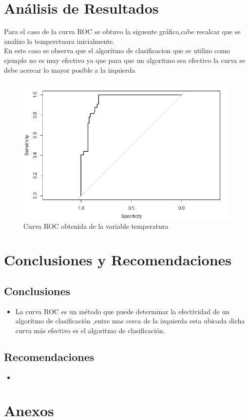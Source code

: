 \documentclass[10pt,a4paper]{article}
\begin{document}
\section{Análisis de Resultados}
Para el caso de la curva ROC se obtuvo la siguente gráfica,cabe recalcar que se analizo la temperetuara inicialmente.\\
En este caso se observa que el algoritmo de clasificacion que se utilizo como ejemplo no es muy efectivo ya que para que un algoritmo sea efectivo la curva se debe acercar lo mayor posible a la izquierda 
\begin{figure}[H]
\centering
\includegraphics[scale=0.48]{curva.png}
\caption{Curva ROC obtenida de la variable temperatura}
\label{esquematic}
\end{figure}
\section{Conclusiones y Recomendaciones}

\subsection*{Conclusiones}
\begin{itemize}
\item La curva ROC es un método que puede determinar la efectividad de un algoritmo de clasificación ,entre mas cerca de la izquierda esta ubicada dicha curva más efectivo es el algoritmo de clasificación.
\end{itemize}

\subsection*{Recomendaciones}
\begin{itemize}
\renewcommand{\labelitemi}{$*$}
\item 
\end{itemize}

\section{Anexos }



\end{document}
